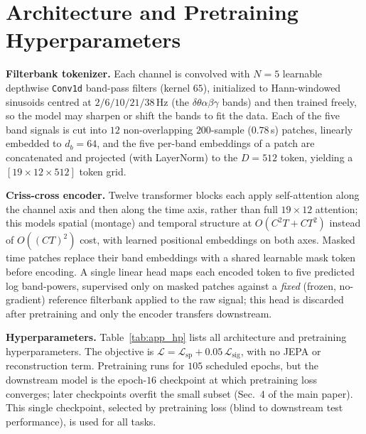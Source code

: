 \documentclass[letterpaper]{article}
\begin{document}
\section{Architecture and Pretraining Hyperparameters}\label{app:hp}
\noindent\textbf{Filterbank tokenizer.} Each channel is convolved with $N{=}5$
learnable depthwise \texttt{Conv1d} band-pass filters (kernel $65$), initialized to
Hann-windowed sinusoids centred at $2/6/10/21/38$\,Hz (the $\delta\theta\alpha\beta
\gamma$ bands) and then trained freely, so the model may sharpen or shift the bands
to fit the data. Each of the five band signals is cut into $12$ non-overlapping
$200$-sample ($0.78$\,s) patches, linearly embedded to $d_b{=}64$, and the five
per-band embeddings of a patch are concatenated and projected (with LayerNorm) to
the $D{=}512$ token, yielding a $[19\times12\times512]$ token grid.

\noindent\textbf{Criss-cross encoder.} Twelve transformer blocks each apply
self-attention along the channel axis and then along the time axis, rather than full
$19{\times}12$ attention; this models spatial (montage) and temporal structure at
$O(C^2T+CT^2)$ instead of $O((CT)^2)$ cost, with learned positional embeddings on
both axes. Masked time patches replace their band embeddings with a shared learnable
mask token before encoding. A single linear head maps each encoded token to five
predicted log band-powers, supervised only on masked patches against a \emph{fixed}
(frozen, no-gradient) reference filterbank applied to the raw signal; this head is
discarded after pretraining and only the encoder transfers downstream.

\noindent\textbf{Hyperparameters.} Table~\ref{tab:app_hp} lists all architecture and
pretraining hyperparameters. The objective is
$\mathcal{L}=\mathcal{L}_{\mathrm{sp}}+0.05\,\mathcal{L}_{\mathrm{sig}}$, with no
JEPA or reconstruction term. Pretraining runs for $105$ scheduled epochs, but the
downstream model is the epoch-$16$ checkpoint at which pretraining loss converges;
later checkpoints overfit the small subset (Sec.~4 of the main paper). This single
checkpoint, selected by pretraining loss (blind to downstream test performance), is
used for all tasks.
\end{document}
